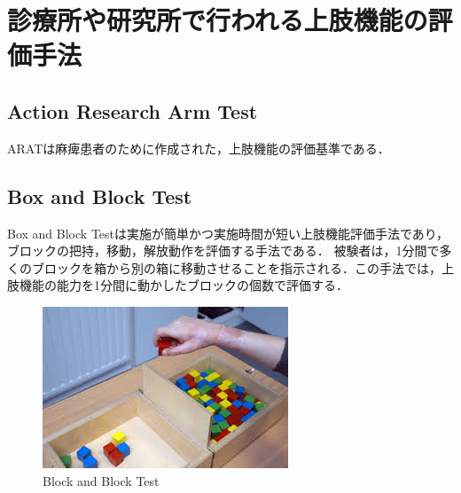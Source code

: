 \section{診療所や研究所で行われる上肢機能の評価手法}

\subsection*{Action Research Arm Test}
ARATは麻痺患者のために作成された，上肢機能の評価基準である\cite{}．

\subsection*{Box and Block Test}
Box and Block Test\cite{T.2005,Mathiowetz1985,Desrosiers1993,Lin2010}は実施が簡単かつ実施時間が短い上肢機能評価手法であり，ブロックの把持，移動，解放動作を評価する手法である．
被験者は，1分間で多くのブロックを箱から別の箱に移動させることを指示される．この手法では，上肢機能の能力を1分間に動かしたブロックの個数で評価する．
\begin{figure}[H]
  \centering
  \includegraphics[width=0.8\linewidth]{fig/ch1/babt}
  \caption{Block and Block Test}
  \label{fig:babt}
\end{figure}




